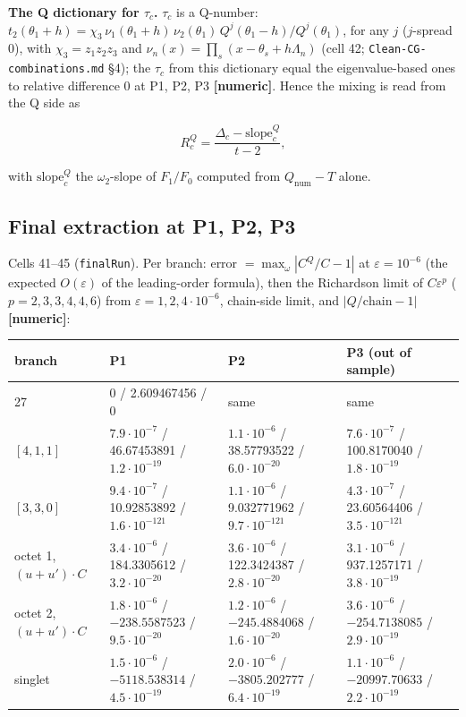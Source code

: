 \documentclass[10pt]{article}
\newcommand{\nb}[1]{\texttt{#1}}
\begin{document}
\textbf{The Q dictionary for $\tau_c$.} $\tau_c$ is a Q-number: $t_2(\theta_1+h)=\chi_3\,\nu_1(\theta_1+h)\,\nu_2(\theta_1)\,Q^j(\theta_1-h)/Q^j(\theta_1)$, for any $j$ ($j$-spread 0), with $\chi_3=z_1z_2z_3$ and $\nu_n(x)=\prod_s(x-\theta_s+h\Lambda_n)$ (cell 42; \nb{Clean-\allowbreak{}CG-\allowbreak{}combinations.\allowbreak{}md} \S{}4); the $\tau_c$ from this dictionary equal the eigenvalue-based ones to relative difference 0 at P1, P2, P3 \textbf{[numeric]}. Hence the mixing is read from the Q side as

\[
R_c^Q=\frac{\Delta_c-\mathrm{slope}_c^Q}{t-2},
\]

with $\mathrm{slope}_c^Q$ the $\omega_2$-slope of $F_1/F_0$ computed from $Q_{\mathrm{num}}-T$ alone.

\subsection{Final extraction at P1, P2, P3}\label{sec:adjF}

Cells 41--45 (\nb{finalRun}). Per branch: error $=\max_\omega|C^Q/C-1|$ at $\varepsilon=10^{-6}$ (the expected $O(\varepsilon)$ of the leading-order formula), then the Richardson limit of $C\varepsilon^{p}$ ($p=2,3,3,4,4,6$) from $\varepsilon=1,2,4\cdot10^{-6}$, chain-side limit, and $|Q/\mathrm{chain}-1|$ \textbf{[numeric]}:

\begin{center}\footnotesize\setlength{\tabcolsep}{3pt}\begin{longtable}{@{}p{2.8cm}p{4.3cm}p{4.3cm}p{4.3cm}@{}}\toprule
\textbf{branch} & \textbf{P1} & \textbf{P2} & \textbf{P3 (out of sample)} \\\midrule\endhead
27 & 0 / 2.609467456 / 0 & same & same \\
$[4,1,1]$ & $7.9\cdot10^{-7}$ / 46.67453891 / $1.2\cdot10^{-19}$ & $1.1\cdot10^{-6}$ / 38.57793522 / $6.0\cdot10^{-20}$ & $7.6\cdot10^{-7}$ / 100.8170040 / $1.8\cdot10^{-19}$ \\
$[3,3,0]$ & $9.4\cdot10^{-7}$ / 10.92853892 / $1.6\cdot10^{-121}$ & $1.1\cdot10^{-6}$ / 9.032771962 / $9.7\cdot10^{-121}$ & $4.3\cdot10^{-7}$ / 23.60564406 / $3.5\cdot10^{-121}$ \\
octet 1, $(u+u')\cdot C$ & $3.4\cdot10^{-6}$ / 184.3305612 / $3.2\cdot10^{-20}$ & $3.6\cdot10^{-6}$ / 122.3424387 / $2.8\cdot10^{-20}$ & $3.1\cdot10^{-6}$ / 937.1257171 / $3.8\cdot10^{-19}$ \\
octet 2, $(u+u')\cdot C$ & $1.8\cdot10^{-6}$ / $-238.5587523$ / $9.5\cdot10^{-20}$ & $1.2\cdot10^{-6}$ / $-245.4884068$ / $1.6\cdot10^{-20}$ & $3.6\cdot10^{-6}$ / $-254.7138085$ / $2.9\cdot10^{-19}$ \\
singlet & $1.5\cdot10^{-6}$ / $-5118.538314$ / $4.5\cdot10^{-19}$ & $2.0\cdot10^{-6}$ / $-3805.202777$ / $6.4\cdot10^{-19}$ & $1.1\cdot10^{-6}$ / $-20997.70633$ / $2.2\cdot10^{-19}$ \\
\bottomrule\end{longtable}\end{center}
\end{document}
